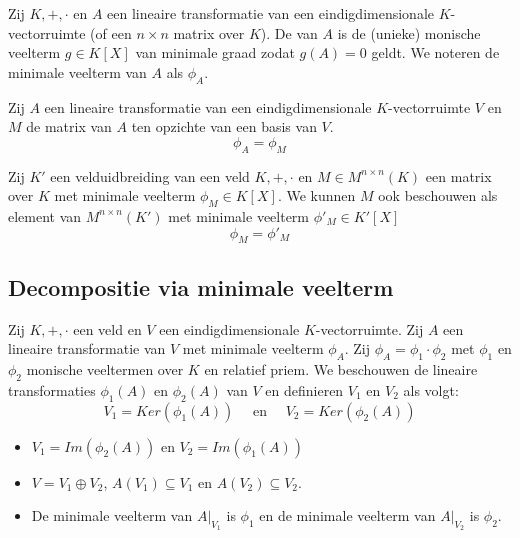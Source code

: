\documentclass[main.tex]{subfiles}
\begin{document}
\begin{de}
  Zij $K,+,\cdot$ en $A$ een lineaire transformatie van een eindigdimensionale $K$-vectorruimte (of een $n\times n$ matrix over $K$).
  De  van $A$ is de (unieke) monische veelterm $g\in K[X]$ van minimale graad zodat $g(A) = 0$ geldt.
  We noteren de minimale veelterm van $A$ als $\phi_{A}$.
\end{de}

\begin{ei}
  Zij $A$ een lineaire transformatie van een eindigdimensionale $K$-vectorruimte $V$ en $M$ de matrix van $A$ ten opzichte van een basis van $V$.
  \[ \phi_{A} = \phi_{M} \]
\end{ei}

\begin{ei}
  Zij $K'$ een velduidbreiding van een veld $K,+,\cdot$ en $M\in M^{n\times n}(K)$ een matrix over $K$ met minimale veelterm $\phi_{M} \in K[X]$.
  We kunnen $M$ ook beschouwen als element van $M^{n\times n}(K')$ met minimale veelterm $\phi'_{M} \in K'[X]$
  \[ \phi_{M} = \phi'_{M} \]
\end{ei}

\subsection{Decompositie via minimale veelterm}
\label{sec:decomp-via-minim}

\begin{pr}
  Zij $K,+,\cdot$ een veld en $V$ een eindigdimensionale $K$-vectorruimte.
  Zij $A$ een lineaire transformatie van $V$ met minimale veelterm $\phi_{A}$.
  Zij $\phi_{A} = \phi_{1} \cdot \phi_{2}$ met $\phi_{1}$ en $\phi_{2}$ monische veeltermen over $K$ en relatief priem.
  We beschouwen de lineaire transformaties $\phi_{1}(A)$ en $\phi_{2}(A)$ van $V$ en definieren $V_{1}$ en $V_{2}$ als volgt:
  \[ V_{1} = Ker(\phi_{1}(A)) \quad\text{ en }\quad V_{2} = Ker(\phi_{2}(A)) \]
  \begin{itemize}
  \item $V_{1} = Im(\phi_{2}(A))$ en $V_{2} = Im(\phi_{1}(A))$
  \item $V = V_{1} \oplus V_{2}$, $A(V_{1}) \subseteq V_{1}$ en $A(V_{2}) \subseteq V_{2}$.
  \item De minimale veelterm van $A|_{V_{1}}$ is $\phi_{1}$ en de minimale veelterm van $A|_{V_{2}}$ is $\phi_{2}$.
  \end{itemize}
\end{pr} 
\end{document}
